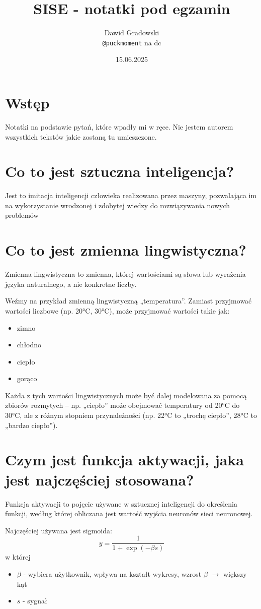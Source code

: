 \documentclass[a4paper,12pt]{article}
\title{SISE - notatki pod egzamin}
\author{Dawid Gradowski \\ \texttt{@puckmoment} na dc}
\date{15.06.2025}
\begin{document}
\maketitle
\thispagestyle{empty}
\newpage
\tableofcontents
\newpage

\section*{Wstęp}
Notatki na podstawie pytań, które wpadły mi w ręce. Nie jestem autorem wszystkich tekstów jakie zostaną tu umieszczone.
\section{Co to jest sztuczna inteligencja?}
Jest to imitacja inteligencji człowieka realizowana przez maszyny,
pozwalająca im na wykorzystanie wrodzonej i zdobytej wiedzy do
rozwiązywania nowych problemów 

\section{Co to jest zmienna lingwistyczna?}
Zmienna lingwistyczna to zmienna, której wartościami są słowa lub wyrażenia języka naturalnego, a nie konkretne liczby.

Weźmy na przykład zmienną lingwistyczną „temperatura”. Zamiast przyjmować wartości liczbowe (np. 20°C, 30°C), może przyjmować wartości takie jak:
\begin{itemize}
    \item zimno
    \item chłodno
    \item ciepło
    \item gorąco
\end{itemize}
Każda z tych wartości lingwistycznych może być dalej modelowana za pomocą zbiorów rozmytych – np. „ciepło” może obejmować temperatury od 20°C do 30°C, ale z różnym stopniem przynależności (np. 22°C to „trochę ciepło”, 28°C to „bardzo ciepło”).
\newpage
\section{Czym jest funkcja aktywacji, jaka jest najczęściej stosowana?}
Funkcja aktywacji to pojęcie używane w sztucznej inteligencji do
określenia funkcji, według której obliczana jest wartość wyjścia
neuronów sieci neuronowej.

Najczęściej używana jest sigmoida:
\[
    y = \frac{1}{1+\exp(-\beta s)}
\]
w której 
\begin{itemize}
    \item $\beta$ - wybiera użytkownik, wpływa na kształt wykresy, wzrost $\beta$ $\to$ większy kąt
    \item $s$ - sygnał
\end{itemize}
\end{document}
